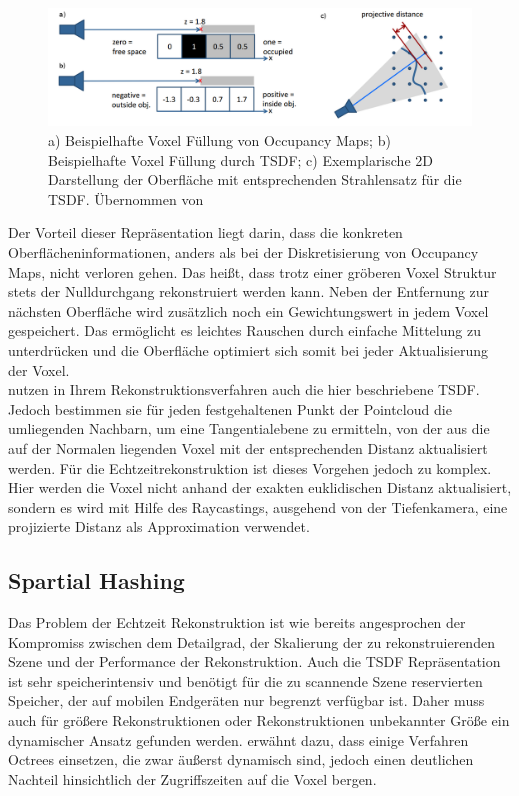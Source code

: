 \begin{figure}
  \centering
	\includegraphics[width=1.0\textwidth]{content/images/methods/tsdf.png} 
  \caption{a) Beispielhafte Voxel Füllung von Occupancy Maps; b) Beispielhafte Voxel Füllung durch TSDF; c) Exemplarische 2D Darstellung der Oberfläche mit entsprechenden Strahlensatz für die TSDF. Übernommen von \citet{Compu66:online}}
  \label{fig:tsdf}
\end{figure}

Der Vorteil dieser Repräsentation liegt darin, dass die konkreten Oberflächeninformationen, anders als bei der Diskretisierung von Occupancy Maps, nicht verloren gehen. Das heißt, dass trotz einer gröberen Voxel Struktur stets der Nulldurchgang rekonstruiert werden kann. Neben der Entfernung zur nächsten Oberfläche wird zusätzlich noch ein Gewichtungswert in jedem Voxel gespeichert. Das ermöglicht es leichtes Rauschen durch einfache Mittelung zu unterdrücken und die Oberfläche optimiert sich somit bei jeder Aktualisierung der Voxel. \citep{Compu66:online}\\

\citet{hoppe1992surface} nutzen in Ihrem Rekonstruktionsverfahren auch die hier beschriebene TSDF. Jedoch bestimmen sie für jeden festgehaltenen Punkt der Pointcloud die umliegenden Nachbarn, um eine Tangentialebene zu ermitteln, von der aus die auf der Normalen liegenden Voxel mit der entsprechenden Distanz aktualisiert werden. Für die Echtzeitrekonstruktion ist dieses Vorgehen jedoch zu komplex. Hier werden die Voxel nicht anhand der exakten euklidischen Distanz aktualisiert, sondern es wird mit Hilfe des Raycastings, ausgehend von der Tiefenkamera, eine projizierte Distanz als Approximation verwendet. \citep{Compu66:online}

\subsection{Spartial Hashing}

Das Problem der Echtzeit Rekonstruktion ist wie bereits angesprochen der Kompromiss zwischen dem Detailgrad, der Skalierung der zu rekonstruierenden Szene und der Performance der Rekonstruktion. Auch die TSDF Repräsentation ist sehr speicherintensiv und benötigt für die zu scannende Szene reservierten Speicher, der auf mobilen Endgeräten nur begrenzt verfügbar ist. Daher muss auch für größere Rekonstruktionen oder Rekonstruktionen unbekannter Größe ein dynamischer Ansatz gefunden werden. \citet{Klingensmith_2015_7924} erwähnt dazu, dass einige Verfahren Octrees einsetzen, die zwar äußerst dynamisch sind, jedoch einen deutlichen Nachteil hinsichtlich der Zugriffszeiten auf die Voxel bergen. \\

